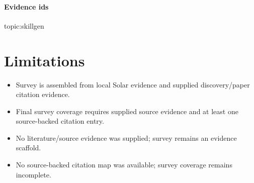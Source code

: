 \documentclass{article}
\begin{document}
\paragraph{Evidence ids} topic:skillgen

\section{Limitations}

\begin{itemize}\item Survey is assembled from local Solar evidence and supplied discovery/paper citation evidence.\end{itemize}
\begin{itemize}\item Final survey coverage requires supplied source evidence and at least one source-backed citation entry.\end{itemize}
\begin{itemize}\item No literature/source evidence was supplied; survey remains an evidence scaffold.\end{itemize}
\begin{itemize}\item No source-backed citation map was available; survey coverage remains incomplete.\end{itemize}
\end{document}
